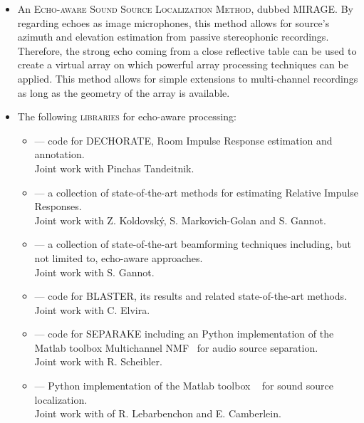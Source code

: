 \begin{itemize}
    \item An \textsc{Echo-aware Sound Source Localization Method}, dubbed \acs{MIRAGE}.
    By regarding echoes as image microphones, this method allows for source's azimuth and elevation estimation from passive stereophonic recordings.
    Therefore, the strong echo coming from a close reflective table can be used to create a virtual array on which powerful array processing techniques can be applied.
    This method allows for simple extensions to multi-channel recordings as long as the geometry of the array is available.

    \item The following \textsc{libraries} for echo-aware processing:
    \begin{itemize}[label={\scriptsize\faCode}]
        \item {} --- code for \acs{DECHORATE}, Room Impulse Response estimation and annotation.
        \\{\small Joint work with Pinchas Tandeitnik.}
        \item {} --- a collection of state-of-the-art methods for estimating Relative Impulse Responses.
        \\{\small Joint work with Z. Koldovsk\'{y}, S. Markovich-Golan and S. Gannot.}
        \item {} --- a collection of state-of-the-art beamforming techniques including, but not limited to, echo-aware approaches.
        \\{\small Joint work with S. Gannot.}
        \item {} --- code for \acs{BLASTER}, its results and related state-of-the-art methods.
        \\{\small Joint work with C. Elvira.}
        \item {} --- code for \acs{SEPARAKE} including an Python implementation of the Matlab toolbox Multichannel NMF~ for audio source separation.
        \\{\small Joint work with R. Scheibler.}
        \item {} --- Python implementation of the Matlab toolbox \href{http://bass-db.gforge.inria.fr/bss_locate/}{}~ for sound source localization.
        \\{\small Joint work with of R. Lebarbenchon and E. Camberlein.}


\end{itemize}
\end{itemize}
